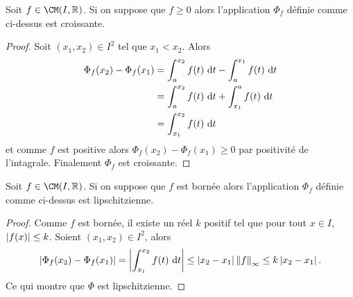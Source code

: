 \begin{prop}
  Soit $f \in \CM(I,\R)$. Si on suppose que $f \geq 0$ alors l'application $\Phi_f$ définie comme ci-dessus est croissante.
\end{prop}
\begin{proof}
  Soit $(x_1,x_2)\in I^2$ tel que $x_1<x_2$. Alors
  \begin{align}
    \Phi_f(x_2)-\Phi_f(x_1) &= \int_a^{x_2} f(t)\,\mathop{}\mathopen{}\mathrm{d} t - \int_a^{x_1} f(t)\,\mathop{}\mathopen{}\mathrm{d} t \\
    &= \int_a^{x_2} f(t)\,\mathop{}\mathopen{}\mathrm{d} t + \int_{x_1}^a f(t)\,\mathop{}\mathopen{}\mathrm{d} t \\
    &= \int_{x_1}^{x_2} f(t)\,\mathop{}\mathopen{}\mathrm{d} t
  \end{align}
  et comme $f$ est positive alors $\Phi_f(x_2)-\Phi_f(x_1) \geq 0$ par positivité de l'intagrale. Finalement $\Phi_f$ est croissante.
\end{proof}

\begin{prop}
  Soit $f \in \CM(I,\R)$. Si on suppose que $f$ est bornée alors l'application $\Phi_f$ définie comme ci-dessus est lipschitzienne. 
\end{prop}
\begin{proof}
  Comme $f$ est bornée, il existe un réel $k$ positif tel que pour tout $x \in I$, $\left\lvert f(x)\right\rvert\leq k$. Soient $(x_1,x_2) \in I^2$, alors
  \begin{equation}
    \left\lvert\Phi_f(x_2)-\Phi_f(x_1)\right\rvert = \left\lvert\int_{x_1}^{x_2} f(t)\,\mathop{}\mathopen{}\mathrm{d} t\right\rvert \leq \left\lvert x_2-x_1\right\rvert \left\lVert f\right\rVert_{\infty} \leq k \left\lvert x_2 -x_1\right\rvert.
  \end{equation}
  Ce qui montre que $\Phi$ est lipschitzienne. 
\end{proof}

